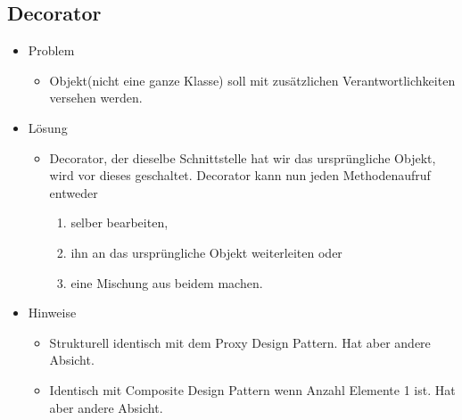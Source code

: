 \documentclass[../ZF_SWEN1.tex]{subfiles}
\begin{document}
\subsection{Decorator}
\begin{itemize}
	\item Problem
	\begin{itemize}
		\item Objekt(nicht eine ganze Klasse) soll mit zusätzlichen Verantwortlichkeiten versehen werden.
	\end{itemize}
	\item Lösung
	\begin{itemize}
		\item Decorator, der dieselbe Schnittstelle hat wir das ursprüngliche Objekt, wird vor dieses geschaltet. Decorator kann nun jeden Methodenaufruf entweder 
		\begin{enumerate}
			\item selber bearbeiten,
			\item ihn an das ursprüngliche Objekt weiterleiten oder
			\item eine Mischung aus beidem machen.
		\end{enumerate}
 
	\end{itemize}
	\item Hinweise
	\begin{itemize}
		\item Strukturell identisch mit dem Proxy Design Pattern. Hat aber andere Absicht.
		\item Identisch mit Composite Design Pattern wenn Anzahl Elemente 1 ist. Hat aber andere Absicht.
	\end{itemize}
\end{itemize}
\end{document}
